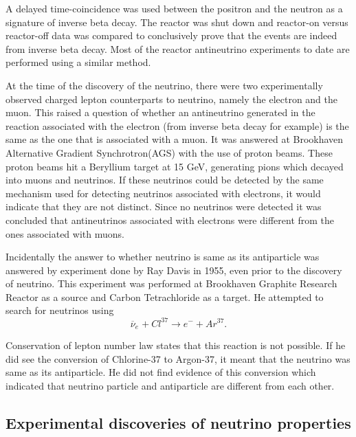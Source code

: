 \documentclass[11pt]{article}
\newcommand{\nuebar}{\ensuremath{\overline{\nu }_{e}} \hspace{1pt}}
\newcommand{\comment}[1]{}
\numberwithin{equation}{section}
\begin{document}
A delayed time-coincidence was used between the positron and the neutron as a signature of inverse beta decay. The reactor was shut down and reactor-on versus reactor-off data was compared to conclusively prove that the events are indeed from inverse beta decay. Most of the reactor antineutrino experiments to date are performed using a similar method. 

At the time of the discovery of the neutrino, there were two experimentally observed charged lepton counterparts to neutrino, namely the electron and the muon. This raised a question of whether an antineutrino generated in the reaction associated with the electron (from inverse beta decay for example) is the same as the one that is associated with a muon. It was answered at Brookhaven Alternative Gradient Synchrotron(AGS) \cite{danby1962observation} with the use of proton beams. These proton beams hit a Beryllium target at 15 GeV, generating pions which decayed into muons and neutrinos. If these neutrinos could be detected by the same mechanism used for detecting neutrinos associated with electrons, it would indicate that they are not distinct. Since no neutrinos were detected it was concluded that antineutrinos associated with electrons were different from the ones associated with muons. 

Incidentally the answer to whether neutrino is same as its antiparticle was answered by experiment done by Ray Davis \cite{davis1955attempt} in 1955, even prior to the discovery of neutrino. This experiment was performed at Brookhaven Graphite Research Reactor as a source and Carbon Tetrachloride as a target. He attempted to search for neutrinos using
\begin{equation}
 \nuebar +Cl ^{37} \rightarrow e^{-} + Ar^{37}.
\end{equation}

Conservation of lepton number law states that this reaction is not possible. If he did see the conversion of Chlorine-37 to Argon-37, it meant that the neutrino was same as its antiparticle. He did not find evidence of this conversion which indicated that neutrino particle and antiparticle are different from each other.
\subsection[Experimental discoveries]{Experimental discoveries of neutrino properties}
\comment{
Lee and Yang \cite{on1956question} have observed parity violation in Kaon decays and suggested radioactive beta-decay as the test for confirmation. To test this hypothesis, Wu observed an asymmetry in distributions of electrons emitted from $^{60} Co$. Following this discovery, new theories in maximal parity violating Vector-Axial structure of weak interactions were developed by Sudarshan, Marshak(cite) at Harvard and Feynman, Gell-Mann(cite) separately. In 1958, V-A theory was confirmed by Golhaber, Grodzins and Sunyar (cite). This theory predicts that neutrinos are left-handed and antineutrinos are right-handed. }
\end{document}
